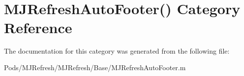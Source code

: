 \hypertarget{category_m_j_refresh_auto_footer_07_08}{}\section{M\+J\+Refresh\+Auto\+Footer() Category Reference}
\label{category_m_j_refresh_auto_footer_07_08}


The documentation for this category was generated from the following file\+:\begin{DoxyCompactItemize}
\item 
Pods/\+M\+J\+Refresh/\+M\+J\+Refresh/\+Base/M\+J\+Refresh\+Auto\+Footer.\+m\end{DoxyCompactItemize}
